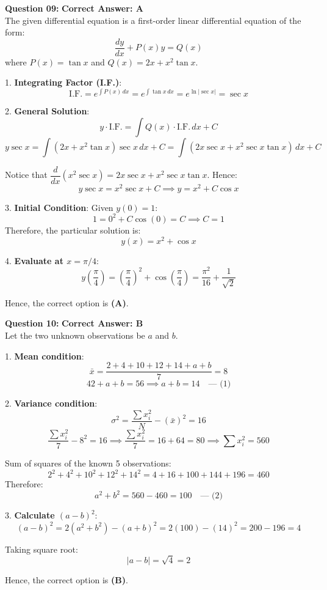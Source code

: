\documentclass[11pt,a4paper]{article}
\begin{document}
\begin{tcolorbox}[solbox]
\textbf{\textcolor{primaryDark}{Question 09:}} \hfill \textbf{\textcolor{l1Green}{Correct Answer: A}}\\
\vspace{4pt}
The given differential equation is a first-order linear differential equation of the form:
$$\frac{dy}{dx} + P(x) y = Q(x)$$
where $P(x) = \tan x$ and $Q(x) = 2x + x^2 \tan x$.

1. \textbf{Integrating Factor (I.F.)}:
$$\text{I.F.} = e^{\int P(x)\, dx} = e^{\int \tan x\, dx} = e^{\ln|\sec x|} = \sec x$$

2. \textbf{General Solution}:
$$y \cdot \text{I.F.} = \int Q(x) \cdot \text{I.F.}\, dx + C$$
$$y \sec x = \int (2x + x^2 \tan x)\sec x\, dx + C = \int (2x \sec x + x^2 \sec x \tan x)\, dx + C$$

Notice that $\dfrac{d}{dx}\left(x^2 \sec x\right) = 2x \sec x + x^2 \sec x \tan x$. Hence:
$$y \sec x = x^2 \sec x + C \implies y = x^2 + C \cos x$$

3. \textbf{Initial Condition}:
Given $y(0) = 1$:
$$1 = 0^2 + C \cos(0) = C \implies C = 1$$
Therefore, the particular solution is:
$$y(x) = x^2 + \cos x$$

4. \textbf{Evaluate at $x = \pi/4$}:
$$y\left(\frac{\pi}{4}\right) = \left(\frac{\pi}{4}\right)^2 + \cos\left(\frac{\pi}{4}\right) = \frac{\pi^2}{16} + \frac{1}{\sqrt{2}}$$

Hence, the correct option is \textbf{(A)}.
\end{tcolorbox}

\begin{tcolorbox}[solbox]
\textbf{\textcolor{primaryDark}{Question 10:}} \hfill \textbf{\textcolor{l1Green}{Correct Answer: B}}\\
\vspace{4pt}
Let the two unknown observations be $a$ and $b$.

1. \textbf{Mean condition}:
$$\bar{x} = \frac{2 + 4 + 10 + 12 + 14 + a + b}{7} = 8$$
$$42 + a + b = 56 \implies a + b = 14 \quad \text{--- (1)}$$

2. \textbf{Variance condition}:
$$\sigma^2 = \frac{\sum x_i^2}{N} - (\bar{x})^2 = 16$$
$$\frac{\sum x_i^2}{7} - 8^2 = 16 \implies \frac{\sum x_i^2}{7} = 16 + 64 = 80 \implies \sum x_i^2 = 560$$

Sum of squares of the known 5 observations:
$$2^2 + 4^2 + 10^2 + 12^2 + 14^2 = 4 + 16 + 100 + 144 + 196 = 460$$
Therefore:
$$a^2 + b^2 = 560 - 460 = 100 \quad \text{--- (2)}$$

3. \textbf{Calculate $(a - b)^2$}:
$$(a - b)^2 = 2(a^2 + b^2) - (a + b)^2 = 2(100) - (14)^2 = 200 - 196 = 4$$

Taking square root:
$$|a - b| = \sqrt{4} = 2$$

Hence, the correct option is \textbf{(B)}.
\end{tcolorbox}
\end{document}
